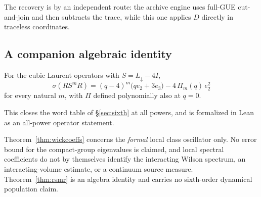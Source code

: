 The recovery is by an independent route: the archive engine uses
full-GUE cut-and-join and then subtracts the trace, while this one
applies $D$ directly in traceless coordinates.

\subsection{A companion algebraic identity}

\begin{theorem}
\label{thm:rsmr}
For the cubic Laurent operators with $S = L_{\downarrow} - 4I$,
\begin{equation}
  \sigma(R S^m R) = (q-4)^m\big(q e_2 + 3 e_3\big) - 4\,\Pi_m(q)\, e_2^2
\end{equation}
for every natural $m$, with $\Pi$ defined polynomially also at $q = 0$.
\end{theorem}

\noindent This closes the word table of \S\ref{sec:sixth} at all powers,
and is formalized in Lean as an all-power operator statement.

\begin{scopenote}
Theorem~\ref{thm:wickcoeffs} concerns the \emph{formal} local class
oscillator only. No error bound for the compact-group eigenvalues is
claimed, and local spectral coefficients do not by themselves identify
the interacting Wilson spectrum, an interacting-volume estimate, or a
continuum source measure. Theorem~\ref{thm:rsmr} is an algebra identity
and carries no sixth-order dynamical population claim.
\end{scopenote}
